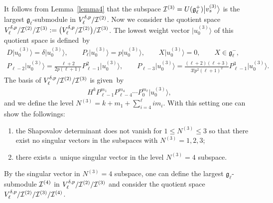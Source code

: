 \documentclass[pdftex]{sigma}
\numberwithin{equation}{section}
\begin{document}
It follows from Lemma~\ref{lemma4} that the subspace $ {\cal I}^{(3)} = U({\mathfrak g}_{\ell}^+) \big|v_s^{(3)}\big\rangle  $ is
the largest ${\mathfrak g}_{\ell}$-submodule in $ V^{\delta,p}_{\ell}/{\cal I}^{(2)}$.
Now we consider the quotient space $ V^{\delta,p}_{\ell}/{\cal I}^{(2)}/{\cal I}^{(3)}:= \big(V^{\delta,p}_{\ell}/{\cal
I}^{(2)}\big)/{\cal I}^{(3)}$.
The lowest weight vector $ \big|u_0^{(3)}\big\rangle  $ of this quotient space is def\/ined~by
\begin{gather*}
    D \big|u_0^{(3)}\big\rangle  = \delta \big|u_0^{(3)}\big\rangle ,
\qquad
P_{\ell} \big|u_0^{(3)}\big\rangle  = p \big|u_0^{(3)}\big\rangle ,
\qquad
    X \big|u_0^{(3)}\big\rangle  = 0, \qquad X \in {\mathfrak g}_{\ell}^-,
\nonumber
\\
    P_{\ell-2} \big|u_0^{(3)}\big\rangle  = \frac{\ell+2}{2p  (\ell+1)} P_{\ell-1}^2 \big|u_0^{(3)}\big\rangle ,
\qquad
P_{\ell-3} \big|u_0^{(3)}\big\rangle  = \frac{(\ell+2) (\ell+3)}{3!  p^2  (\ell+1)^2} P_{\ell-1}^3\big|u_0^{(3)}\big\rangle .
\end{gather*}
The basis of $ V^{\delta,p}_{\ell}/{\cal I}^{(2)}/{\cal I}^{(3)} $ is given~by
\begin{gather*}
H^k  P_{\ell-1}^{m_1} P_{\ell-4}^{m_4} \cdots P_0^{m_{\ell}} \big|u_0^{(3)}\big\rangle ,
\end{gather*}
and we def\/ine the level $  N^{(3)} = k + m_1 + \sum\limits_{i=4}^{\ell} i  m_i$.
With this setting one can show the followings:
\begin{enumerate}\itemsep=0pt
\item[i)] the Shapovalov determinant does not vanish for $ 1 \leq N^{(3)} \leq 3 $ so that there exist no singular vectors
in the subspaces with $ N^{(3)} = 1, 2, 3$;
\item[ii)] there exists a~unique singular vector in the level $ N^{(3)} = 4 $ subspace.
\end{enumerate}
By the singular vector in $ N^{(3)} = 4 $ subspace, one can def\/ine the largest ${\mathfrak g}_{\ell}$-submodule $ {\cal
I}^{(4)} $ in $ V^{\delta,p}_{\ell}/{\cal I}^{(2)}/{\cal I}^{(3)} $ and consider the quotient space $
V^{\delta,p}_{\ell}/{\cal I}^{(2)}/{\cal I}^{(3)}/{\cal I}^{(4)}$.
\end{document}
